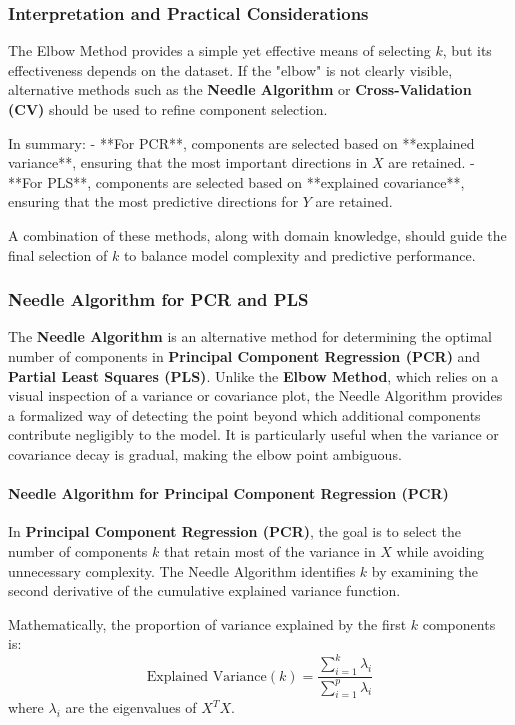 \documentclass[11pt,twoside,a4paper]{article}
\begin{document}
\subsubsection{Interpretation and Practical Considerations}
The Elbow Method provides a simple yet effective means of selecting \( k \), but its effectiveness depends on the dataset. If the "elbow" is not clearly visible, alternative methods such as the \textbf{Needle Algorithm} or \textbf{Cross-Validation (CV)} should be used to refine component selection.

In summary:
- **For PCR**, components are selected based on **explained variance**, ensuring that the most important directions in \( X \) are retained.
- **For PLS**, components are selected based on **explained covariance**, ensuring that the most predictive directions for \( Y \) are retained.

A combination of these methods, along with domain knowledge, should guide the final selection of \( k \) to balance model complexity and predictive performance.

\subsubsection{Needle Algorithm for PCR and PLS}
The \textbf{Needle Algorithm} is an alternative method for determining the optimal number of components in \textbf{Principal Component Regression (PCR)} and \textbf{Partial Least Squares (PLS)}. Unlike the \textbf{Elbow Method}, which relies on a visual inspection of a variance or covariance plot, the Needle Algorithm provides a formalized way of detecting the point beyond which additional components contribute negligibly to the model. It is particularly useful when the variance or covariance decay is gradual, making the elbow point ambiguous.

\paragraph{Needle Algorithm for Principal Component Regression (PCR)}
In \textbf{Principal Component Regression (PCR)}, the goal is to select the number of components \( k \) that retain most of the variance in \( X \) while avoiding unnecessary complexity. The Needle Algorithm identifies \( k \) by examining the second derivative of the cumulative explained variance function.

Mathematically, the proportion of variance explained by the first \( k \) components is:
\[
\text{Explained Variance}(k) = \frac{\sum_{i=1}^{k} \lambda_i}{\sum_{i=1}^{p} \lambda_i}
\]
where \( \lambda_i \) are the eigenvalues of \( X^T X \). 
\end{document}
